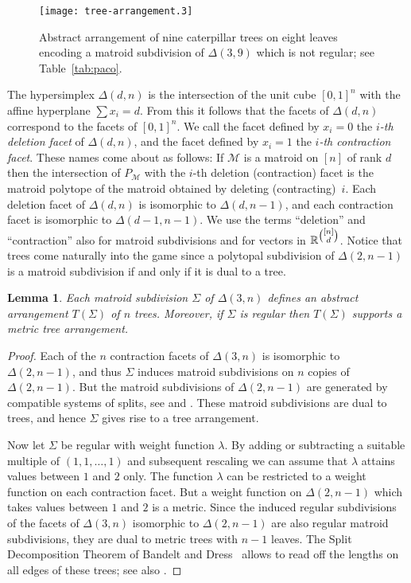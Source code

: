 \documentclass[12pt,a4paper]{amsart}
\newtheorem{lem}[thm]{Lemma}
\theoremstyle{definition}
\newcommand{\R}{{\mathbb{R}}}
\providecommand\cM{{\mathscr{M}}}
\providecommand{\MatroidPolytope}[1]{P_{#1}}
\begin{document}
\begin{figure}[hbt]\centering
  \texttt{[image: tree-arrangement.3]}
  \caption{Abstract arrangement of nine caterpillar trees on eight
    leaves encoding a matroid subdivision of $\Delta(3,9)$ which is
    not regular; see Table~\ref{tab:paco}.}
  \label{fig:paco}
\end{figure}

The hypersimplex $\Delta(d,n)$ is the intersection of the unit cube
$[0,1]^n$ with the affine hyperplane $\sum x_i=d$.  From this it
follows that the facets of $\Delta(d,n)$ correspond to the facets of
$[0,1]^n$.  We call the facet defined by $x_i=0$ the \emph{$i$-th
  deletion facet} of $\Delta(d,n)$, and the facet defined by $x_i=1$
the \emph{$i$-th contraction facet}.  These names come about as
follows: If $\cM$ is a matroid on $[n]$ of rank $d$ then the
intersection of $\MatroidPolytope{\cM}$ with the $i$-th deletion
(contraction) facet is the matroid polytope of the matroid obtained by
deleting (contracting)~$i$.  Each deletion facet of $\Delta(d,n)$ is
isomorphic to $\Delta(d,n-1)$, and each contraction facet is
isomorphic to $\Delta(d-1,n-1)$.  We use the terms ``deletion'' and
``contraction'' also for matroid subdivisions and for vectors in
$\R^{\tbinom{[n]}{d}}$.  Notice that trees come naturally into the
game since a polytopal subdivision of $\Delta(2,n-1)$ is a matroid
subdivision if and only if it is dual to a tree.

\begin{lem}\label{lem:arrangement}
  Each matroid subdivision $\Sigma$ of $\Delta(3,n)$ defines
  an abstract arrangement $T(\Sigma)$ of $n$ trees.  Moreover, if
  $\Sigma$ is regular then $T(\Sigma)$ supports a metric
tree arrangement.
\end{lem}

\begin{proof}
  Each of the $n$ contraction facets of $\Delta(3,n)$ is isomorphic to
  $\Delta(2,n-1)$, and thus $\Sigma$ induces matroid subdivisions on
  $n$ copies of $\Delta(2,n-1)$.  But the matroid subdivisions of
  $\Delta(2,n-1)$ are generated by compatible systems of splits, see
  \cite[Theorem 3.4]{SS} and \cite[\S6]{HJ}.  These matroid
  subdivisions are dual to trees, and hence $\Sigma$ gives rise to a
  tree arrangement.

  Now let $\Sigma$ be regular with weight function $\lambda$. By
  adding or subtracting a suitable multiple of $(1,1,\ldots,1)$ and
  subsequent rescaling we can assume that $\lambda$ attains values
  between $1$ and $2$ only.  The function $\lambda$ can be restricted
  to a weight function on each contraction facet.  But a weight
  function on $\Delta(2,n-1)$ which takes values between $1$ and $2$
  is a metric.  Since the induced regular subdivisions of the facets
  of $\Delta(3,n)$ isomorphic to $\Delta(2,n-1)$ are also regular
  matroid subdivisions, they are dual to metric trees with $n-1$
  leaves.  The Split Decomposition Theorem of Bandelt and
  Dress~\cite[Theorem~2]{BD} allows to read off the lengths on all
  edges of these trees; see also \cite[Theorem~3.10]{HJ}.
\end{proof}
\end{document}
